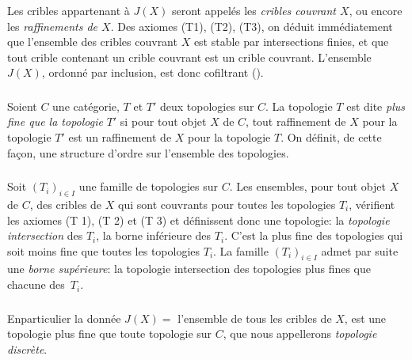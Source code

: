 \setcounter{subsection}{1}
\subsubsection{}

Les cribles appartenant à $J(X)$ seront appelés les \emph{cribles
  couvrant $X$}, ou encore les \emph{raffinements de $X$}. Des axiomes
  (T1), (T2), (T3), on déduit immédiatement que l'ensemble des
  cribles couvrant $X$ est stable par intersections finies, et que
  tout crible contenant un crible couvrant est un crible
  couvrant. L'ensemble $J(X)$, ordonné par inclusion, est donc
  cofiltrant ().

\subsubsection{}

Soient $C$ une catégorie, $T$ et $T'$ deux topologies sur $C$. La
topologie $T$ est dite \emph{plus fine que la topologie} $T'$ si
pour tout objet $X$ de $C$, tout raffinement de $X$ pour la
topologie $T'$ est un raffinement de $X$ pour la topologie $T$. On
définit, de cette façon, une structure d'ordre sur l'ensemble
des topologies.

\subsubsection{}

Soit $(T_i)_{i\in I}$ une famille de topologies sur $C$. Les
ensembles, pour tout objet $X$ de $C$, des cribles de $X$ qui sont
couvrants pour toutes les topologies $T_i$, vérifient les axiomes
(T 1), (T 2) et (T 3) et définissent donc une topologie: la
\emph{topologie intersection} des $T_i$, \ie la borne inférieure
des $T_i$. C'est la plus fine des topologies qui soit moins fine que
toutes les topologies $T_i$. La famille $(T_i)_{i \in I}$ admet par
suite une \emph{borne supérieure}: la topologie intersection des
topologies plus fines que chacune des~$T_i$.

\subsubsection{}
En\pageoriginale particulier la donnée $J(X)=$ l'ensemble de tous
les cribles de $X$, est une topologie plus fine que toute topologie
sur $C$, que nous appellerons \emph{topologie discrète}.

